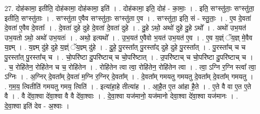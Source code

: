 \documentclass[17pt]{extarticle}
\begin{document}
27. दोह॑कामा॒ इतीति॒ दोह॑कामा॒ दोह॑कामा॒ इति॑ । . दोह॑कामा॒ इति॒ दोह॑ - का॒माः॒ । . इति॒ सꣳस्तु॑ताः॒ सꣳस्तु॑ता॒ इतीति॒ सꣳस्तु॑ताः । . सꣳस्तु॑ता ए॒वैव सꣳस्तु॑ताः॒ सꣳस्तु॑ता ए॒व । . सꣳस्तु॑ता॒ इति॒ सं - स्तु॒ताः॒ । . ए॒व दे॒वता॑ दे॒वता॑ ए॒वैव दे॒वताः᳚ । . दे॒वता॑ दुहे दुहे दे॒वता॑ दे॒वता॑ दुहे । . दु॒हे ऽथो॒ अथो॑ दुहे दु॒हे ऽथो᳚ । . अथो॑ उभ॒यत॑ उभ॒यतो ऽथो॒ अथो॑ उभ॒यतः॑ । . अथो॒ इत्यथो᳚ । . उ॒भ॒यत॑ ए॒वैवो भ॒यत॑ उभ॒यत॑ ए॒व । . ए॒व य॒ज्ञ्ं ॅय॒ज्ञ् मे॒वैव य॒ज्ञ्म् । . य॒ज्ञ्म् दु॑हे दुहे य॒ज्ञ्ं ॅय॒ज्ञ्म् दु॑हे । . दु॒हे॒ पु॒रस्ता᳚त् पु॒रस्ता᳚द् दुहे दुहे पु॒रस्ता᳚त् । . पु॒रस्ता᳚च् च च पु॒रस्ता᳚त् पु॒रस्ता᳚च् च । . चो॒परि॑ष्टा दु॒परि॑ष्टाच् च चो॒परि॑ष्टात् । . उ॒परि॑ष्टाच् च चो॒परि॑ष्टा दु॒परि॑ष्टाच् च । . च॒ रोहि॑तेन॒ रोहि॑तेन च च॒ रोहि॑तेन । . रोहि॑तेन त्वा त्वा॒ रोहि॑तेन॒ रोहि॑तेन त्वा । . त्वा॒ ऽग्नि र॒ग्नि स्त्वा᳚ त्वा॒ ऽग्निः । . अ॒ग्निर् दे॒वता᳚म् दे॒वता॑ म॒ग्नि र॒ग्निर् दे॒वता᳚म् । . दे॒वता᳚म् गमयतु गमयतु दे॒वता᳚म् दे॒वता᳚म् गमयतु । . ग॒म॒य॒ त्वितीति॑ गमयतु गमय॒ त्विति॑ । . इत्या॑हा॒हे तीत्या॑ह । . आ॒है॒त ए॒त आ॑हा है॒ते । . ए॒ते वै वा ए॒त ए॒ते वै । . वै दे॑वा॒श्वा दे॑वा॒श्वा वै वै दे॑वा॒श्वाः । . दे॒वा॒श्वा यज॑मानो॒ यज॑मानो देवा॒श्वा दे॑वा॒श्वा यज॑मानः । . दे॒वा॒श्वा इति॑ देव - अ॒श्वाः । \newline
\end{document}
